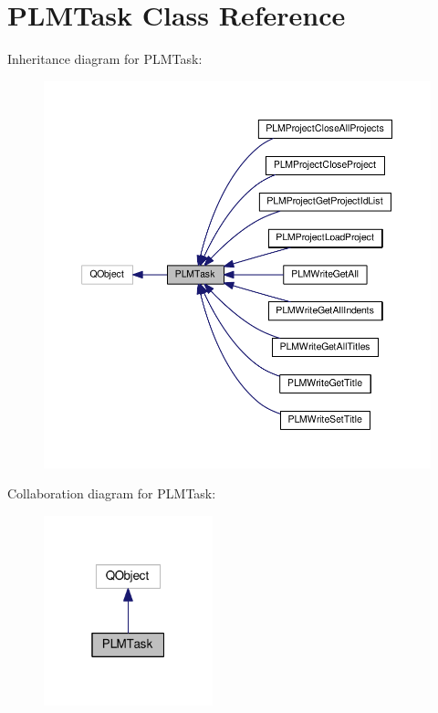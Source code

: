 \hypertarget{class_p_l_m_task}{}\section{P\+L\+M\+Task Class Reference}
\label{class_p_l_m_task}


Inheritance diagram for P\+L\+M\+Task\+:\nopagebreak
\begin{figure}[H]
\begin{center}
\leavevmode
\includegraphics[width=350pt]{class_p_l_m_task__inherit__graph}
\end{center}
\end{figure}


Collaboration diagram for P\+L\+M\+Task\+:\nopagebreak
\begin{figure}[H]
\begin{center}
\leavevmode
\includegraphics[width=139pt]{class_p_l_m_task__coll__graph}
\end{center}
\end{figure}
